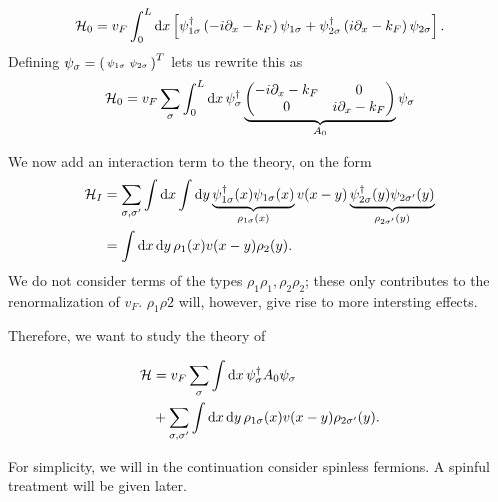 \begin{equation}
\mathcal{H}_0 = v_F\int_{0}^{L}\dd x\left[\psi_{1\sigma}^\dagger\left(-i\partial_x -k_F\right)\psi_{1\sigma} + \psi_{2\sigma}^\dagger\left(i\partial_x - k_F\right)\psi_{2\sigma}\right].
\end{equation}
Defining $\psi_\sigma = \begin{psmallmatrix*} \psi_{1\sigma} & \psi_{2\sigma}
\end{psmallmatrix*}^T$ lets us rewrite this as
\begin{equation}
\label{eq:imp_def_a0}
\mathcal{H}_0 = v_F\sum_\sigma\int_{0}^{L}\dd x\,\psi_\sigma^\dagger
\underbrace{\begin{pmatrix}
-i\partial_x - k_F & 0 \\
0 &  i\partial_x - k_F 
\end{pmatrix}}_{A_0}\psi_\sigma
\end{equation}

We now add an interaction term to the theory, on the form
\begin{align*}
\mathcal{H}_I &= \sum_{\sigma,\sigma'}\int\dd x\int\dd y\underbrace{\psi_{1\sigma}^\dagger(x)\psi_{1\sigma}(x)}_{\rho_{1\sigma}(x)}v(x-y)\underbrace{\psi_{2\sigma}^\dagger(y)\psi_{2\sigma'}(y)}_{\rho_{2\sigma'}(y)} \\
&= \int \dd{x}\dd{y} \rho_1(x)v(x-y)\rho_2(y).
\end{align*}
We do not consider terms of the types $\rho_1\rho_1, \rho_2\rho_2$; these only contributes to the renormalization of $v_F$. $\rho_1\rho2$ will, however, give rise to more intersting effects.

Therefore, we want to study the theory of

\begin{align}
\begin{split}
\mathcal{H} &= v_F \sum_\sigma \int\dd{x}\psi_\sigma^\dagger A_0\psi_\sigma \\
&+ \sum_{\sigma,\sigma'}\int \dd{x}\dd{y} \rho_{1\sigma}(x)v(x-y)\rho_{2\sigma'}(y).
\end{split}
\end{align}

For simplicity, we will in the continuation consider spinless fermions. A spinful treatment will be given later. 

